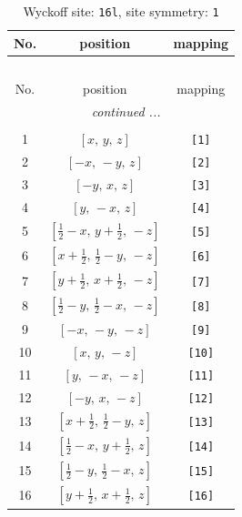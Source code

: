 \documentclass[fleqn,8pt]{jsarticle}
\begin{document}
\begin{longtable}{ccc}
\caption{Wyckoff site: {\tt 16l}, site symmetry: {\tt 1}}
 \\
 \hline \hline
No. & position & mapping \\ \hline \endfirsthead

\multicolumn{2}{l}{\tablename\ \thetable{}} \\
 \hline \hline
No. & position & mapping \\ \hline \endhead

 \hline \hline
\multicolumn{2}{r}{\footnotesize\it continued ...} \\ \endfoot

 \hline \hline
\multicolumn{2}{r}{} \\ \endlastfoot

1 & $\left[ x,\, y,\, z \right]$ & {\tt [1]} \\ \hline
2 & $\left[ - x,\, - y,\, z \right]$ & {\tt [2]} \\ \hline
3 & $\left[ - y,\, x,\, z \right]$ & {\tt [3]} \\ \hline
4 & $\left[ y,\, - x,\, z \right]$ & {\tt [4]} \\ \hline
5 & $\left[ \frac{1}{2} - x,\, y + \frac{1}{2},\, - z \right]$ & {\tt [5]} \\ \hline
6 & $\left[ x + \frac{1}{2},\, \frac{1}{2} - y,\, - z \right]$ & {\tt [6]} \\ \hline
7 & $\left[ y + \frac{1}{2},\, x + \frac{1}{2},\, - z \right]$ & {\tt [7]} \\ \hline
8 & $\left[ \frac{1}{2} - y,\, \frac{1}{2} - x,\, - z \right]$ & {\tt [8]} \\ \hline
9 & $\left[ - x,\, - y,\, - z \right]$ & {\tt [9]} \\ \hline
10 & $\left[ x,\, y,\, - z \right]$ & {\tt [10]} \\ \hline
11 & $\left[ y,\, - x,\, - z \right]$ & {\tt [11]} \\ \hline
12 & $\left[ - y,\, x,\, - z \right]$ & {\tt [12]} \\ \hline
13 & $\left[ x + \frac{1}{2},\, \frac{1}{2} - y,\, z \right]$ & {\tt [13]} \\ \hline
14 & $\left[ \frac{1}{2} - x,\, y + \frac{1}{2},\, z \right]$ & {\tt [14]} \\ \hline
15 & $\left[ \frac{1}{2} - y,\, \frac{1}{2} - x,\, z \right]$ & {\tt [15]} \\ \hline
16 & $\left[ y + \frac{1}{2},\, x + \frac{1}{2},\, z \right]$ & {\tt [16]} \\
\end{longtable}
\end{document}
